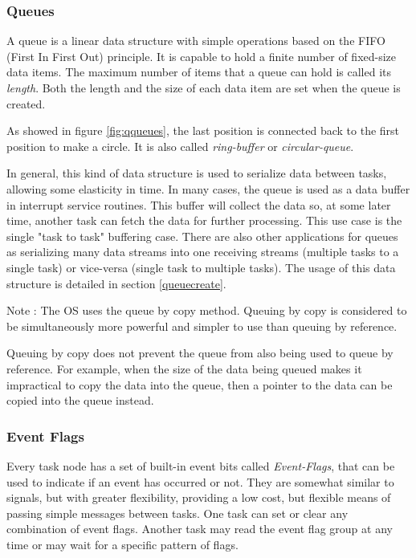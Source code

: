 \documentclass{article}
\begin{document}
\subsubsection{Queues}
A queue is a linear data structure with simple operations based on the FIFO (First In First Out) principle. It is capable to hold a finite number of fixed-size data items. The maximum number of items that a queue can hold is called its \textit{length}. Both the length and the size of each data item are set when the queue is created.



As showed in figure \ref{fig:qqueues}, the last position is connected back to the first position to make a circle. It is also called \textit{ring-buffer} or \textit{circular-queue}. 

In general, this kind of data structure is used to serialize data between tasks, allowing some elasticity in time. In many cases, the queue is used as a data buffer in interrupt service routines. This buffer will collect the data so, at some later time, another task can fetch the data for further processing. This use case is the single "task to task" buffering case. There are also other applications for queues as serializing  many data streams into one receiving streams (multiple tasks to a single task) or vice-versa (single task to multiple tasks).
The usage of this data structure is detailed in section \ref{queuecreate}. \\

\begin{tcolorbox}
\ArrowBoldDownRight Note : The OS uses the queue by copy method. Queuing by copy is considered to be simultaneously more powerful and simpler to use than queuing by reference.
\end{tcolorbox}

Queuing by copy does not prevent the queue from also being used to queue by reference. For example, when the size of the data being queued makes it impractical to copy the data into the queue, then a pointer to the data can be copied into the queue instead.

\subsubsection{Event Flags}
Every task node has a set of built-in event bits called \textit{Event-Flags}, that can be used to indicate if an event has occurred or not.  
They are somewhat similar to signals, but with greater flexibility, providing a low cost, but flexible means of passing simple messages between tasks. One task can set or clear any combination of event flags. Another task may read the event flag group at any time or may wait for a specific pattern of flags.  

\end{document}
